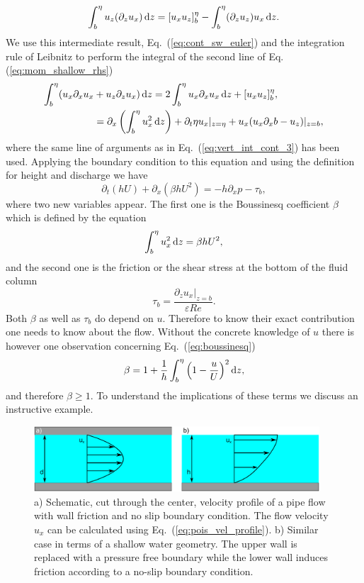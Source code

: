 \begin{equation}
    \int_b^{\eta}u_z(\partial_{z} u_x)\mathop{}\!\mathrm{d} z = [u_x u_z]_b^{\eta} - \int_b^{\eta} (\partial_z u_z) u_x \mathop{}\!\mathrm{d} z.
\end{equation}
We use this intermediate result, Eq.~(\ref{eq:cont_sw_euler}) and the integration rule of Leibnitz to perform the integral of the second line of Eq.(\ref{eq:mom_shallow_rhs}) 
\begin{align}
    \int_b^{\eta}(u_x\partial_x u_x &+ u_z\partial_{z} u_x )\mathop{}\!\mathrm{d} z = 2\int_b^{\eta} u_x\partial_x u_x \mathop{}\!\mathrm{d} z + [u_x u_z]_b^{\eta},\nonumber \\
     &= \partial_x\left(\int_b^{\eta}u_x^2 \mathop{}\!\mathrm{d} z\right) + \partial_t\eta u_x|_{z=\eta} + u_x(u_x\partial_x b - u_z)|_{z=b},
\end{align}
where the same line of arguments as in Eq.~(\ref{eq:vert_int_cont_3}) has been used.
Applying the boundary condition to this equation and using the definition for height and discharge we have
\begin{equation}\label{eq:sw_mom_final}
    \partial_t(hU) + \partial_x(\beta hU^2) = -h\partial_x p - \tau_b,
\end{equation}
where two new variables appear.
The first one is the Boussinesq coefficient $\beta$ which is defined by the equation
\begin{equation}\label{eq:boussinesq}
    \int_b^{\eta} u_x^2 \mathop{}\!\mathrm{d} z = \beta h U^2,
\end{equation}
and the second one is the friction or the shear stress at the bottom of the fluid column
\begin{equation}\label{eq:sw_bot_friction}
    \tau_b = \frac{\partial_z u_x|_{z=b}}{\varepsilon Re}. 
\end{equation}
Both $\beta$ as well as $\tau_b$ do depend on $u$. 
Therefore to know their exact contribution one needs to know about the flow.
Without the concrete knowledge of $u$ there is however one observation concerning Eq.~(\ref{eq:boussinesq})
\begin{equation}\label{eq:beta_lims}
    \beta = 1 + \frac{1}{h}\int_b^{\eta}\left(1 - \frac{u}{U}\right)^2 \mathop{}\!\mathrm{d} z,
\end{equation}
and therefore $\beta \geq 1$.
To understand the implications of these terms we discuss an instructive example.

\begin{figure}
    \centering
    \includegraphics[width=0.95\textwidth]{graphics/Simple_flow.pdf}
    \caption{a) Schematic, cut through the center, velocity profile of a pipe flow with wall friction and no slip boundary condition.
    The flow velocity $u_x$ can be calculated using Eq.~(\ref{eq:pois_vel_profile}).
    b) Similar case in terms of a shallow water geometry. 
    The upper wall is replaced with a pressure free boundary while the lower wall induces friction according to a no-slip boundary condition.
    }
    \label{fig:pois_vel_profile}
\end{figure}
